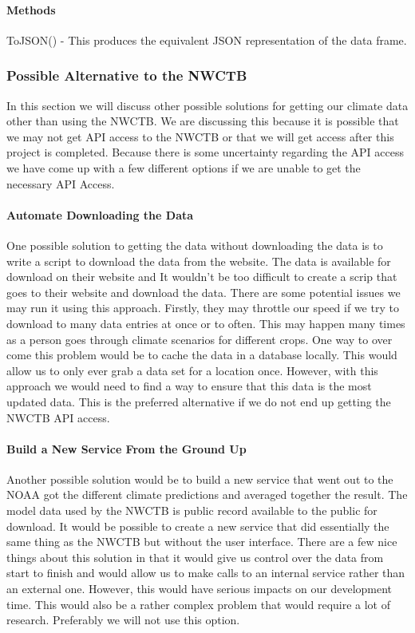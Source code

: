 \documentclass[onecolumn, draftclsnofoot,10pt, compsoc]{article}
\begin{document}
			\paragraph{\textbf{Methods}}
			ToJSON() - This produces the equivalent JSON representation of the data frame.\\


			\subsubsection{Possible Alternative to the NWCTB}
				In this section we will discuss other possible solutions for getting our climate data other than using the NWCTB. We are discussing this because it is possible that we may not get API access to the NWCTB or that we will get access after this project is completed. Because there is some uncertainty regarding the API access we have come up with a few different options if we are unable to get the necessary API Access.\\

				\paragraph{\textbf{Automate Downloading the Data}} \hfill \break
				One possible solution to getting the data without downloading the data is to write a script to download the data from the website. The data is available for download on their website and It wouldn't be too difficult to create a scrip that goes to their website and download the data. There are some potential issues we may run it using this approach. Firstly, they may throttle our speed if we try to download to many data entries at once or to often. This may happen many times as a person goes through climate scenarios for different crops. One way to over come this problem would be to cache the data in a database locally. This would allow us to only ever grab a data set for a location once. However, with this approach we would need to find a way to ensure that this data is the most updated data. This is the preferred alternative if we do not end up getting the NWCTB API access.\\
				\paragraph{\textbf{Build a New Service From the Ground Up}} \hfill \break
				Another possible solution would be to build a new service that went out to the NOAA got the different climate predictions and averaged together the result. The model data used by the NWCTB is public record available to the public for download. It would be possible to create a new service that did essentially the same thing as the NWCTB but without the user interface. There are a few nice things about this solution in that it would give us control over the data from start to finish and would allow us to make calls to an internal service rather than an external one. However, this would have serious impacts on our development time. This would also be a rather complex problem that would require a lot of research. Preferably we will not use this option.\\
\end{document}
